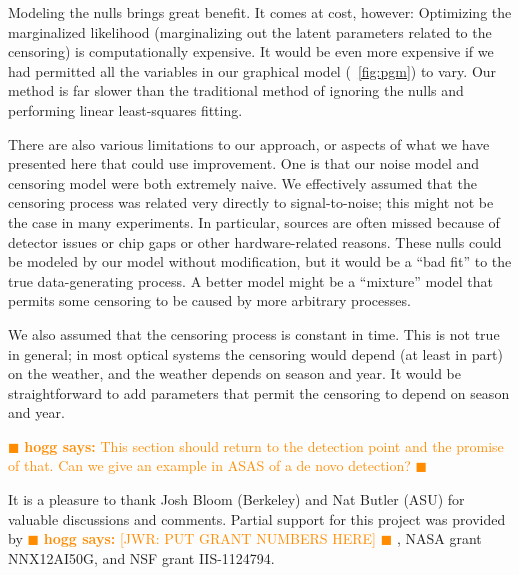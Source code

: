 \documentclass[12pt,preprint]{aastex}
\newcommand{\hogg}[1] { \textcolor{darkorange} {
\ensuremath{\blacksquare} {\bf hogg says:}  {#1}
\ensuremath{\blacksquare} } }
\begin{document}
Modeling the nulls brings great benefit.  It comes at cost, however:
Optimizing the marginalized likelihood (marginalizing out the latent
parameters related to the censoring) is computationally expensive.
It would be even more expensive if we had permitted all the
variables in our graphical model (\figurename~\ref{fig:pgm}) to vary.
Our method is far slower than the traditional method of ignoring the
nulls and performing linear least-squares fitting.

There are also various limitations to our approach, or aspects of what
we have presented here that could use improvement.  One is that our
noise model and censoring model were both extremely naive.  We
effectively assumed that the censoring process was related very
directly to signal-to-noise; this might not be the case in many
experiments.  In particular, sources are often missed because of
detector issues or chip gaps or other hardware-related reasons.  These
nulls could be modeled by our model without modification, but it would
be a ``bad fit'' to the true data-generating process.  A better model
might be a ``mixture'' model that permits some censoring to be caused
by more arbitrary processes.

We also assumed that the censoring process is constant in time.  This
is not true in general; in most optical systems the censoring would
depend (at least in part) on the weather, and the weather depends on
season and year.  It would be straightforward to add parameters that
permit the censoring to depend on season and year.

\hogg{This section should return to the detection point and the promise of that.  Can we give an example in ASAS of a de novo detection?}


\acknowledgements It is a pleasure to thank
%
  Josh Bloom (Berkeley) and
  Nat Butler (ASU)
%
for valuable discussions and comments.
%
Partial support for this project was provided by \hogg{[JWR: PUT GRANT
  NUMBERS HERE]}, NASA grant NNX12AI50G, and NSF grant IIS-1124794.


\end{document}
